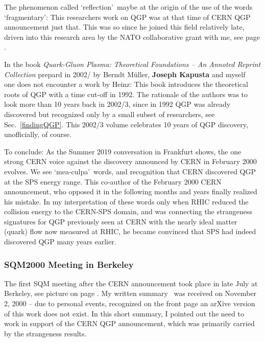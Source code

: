The phenomenon called \lq reflection\rq\ maybe at the origin of the use of the words \lq fragmentary\rq: This researchers work on QGP was at that time of CERN QGP announcement just that.  This was so since he joined this field relatively late, driven into this research area by the NATO collaborative grant with me, see page \pageref{NATOfun}. 

In the book \textit{Quark-Gluon Plasma: Theoretical Foundations -- An Annoted Reprint Collection} prepard in 2002/ by Berndt M\"uller, \textbf{Joseph Kapusta} and myself~\cite{Rafelski:2003zz} one does not encounter a work by Heinz: This book introduces the theoretical roots of QGP with a time cut-off in 1992. The rationale of the authors was to look more than 10 years back in 2002/3, since in 1992 QGP was already discovered but recognized only by a small subset of researchers, see Sec.~\ref{findingQGP}. This 2002/3 volume celebrates 10 years of QGP discovery, unofficially, of course.

To conclude: As the Summer 2019 conversation in Frankfurt shows, the one strong CERN voice  against the discovery announced by CERN in February 2000 evolves. We see  \lq mea-culpa\rq\ words, and recognition that CERN discovered QGP at the SPS energy range. This co-author of the February 2000 CERN announcement, who opposed it in the following months and years finally realized his mistake. In my interpretation of these words only when RHIC reduced the collision energy to the CERN-SPS domain, and was connecting the strangeness signatures for QGP previously seen at CERN with the nearly ideal matter (quark) flow now measured at RHIC, he became convinced that SPS had indeed discovered QGP many years earlier. 

\subsubsection{SQM2000 Meeting in Berkeley}\label{Berk2000}

The first  SQM meeting  after the CERN announcement took place in late July at Berkeley, see picture on page \pageref{SQM2000Group}.  My written summary~\cite{Rafelski:2001rj}   was received on November 2, 2000 -- due to personal events, recognized on the front page an arXive version of this work does not exist. In this short summary, I pointed out the  need to work in support of the CERN QGP announcement, which was primarily carried by the strangeness results. 

